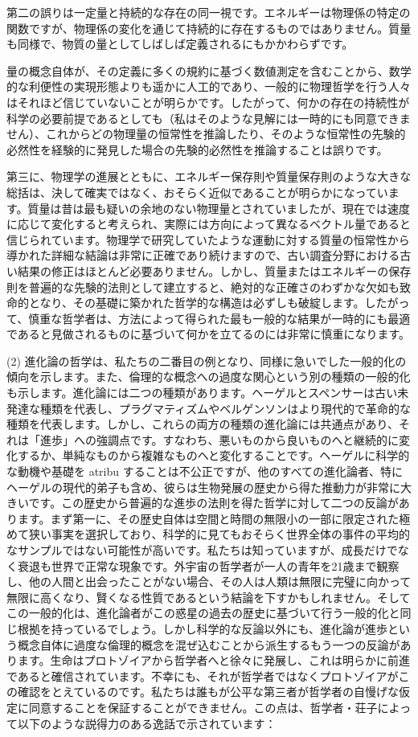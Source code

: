 \documentclass[a4paper,11pt,openany]{ltjsbook}
\begin{document}
第二の誤りは一定量と持続的な存在の同一視です。エネルギーは物理係の特定の関数ですが、物理係の変化を通じて持続的に存在するものではありません。質量も同様で、物質の量としてしばしば定義されるにもかかわらずです。

量の概念自体が、その定義に多くの規約に基づく数値測定を含むことから、数学的な利便性の実現形態よりも遥かに人工的であり、一般的に物理哲学を行う人々はそれほど信じていないことが明らかです。したがって、何かの存在の持続性が科学の必要前提であるとしても（私はそのような見解には一時的にも同意できません）、これからどの物理量の恒常性を推論したり、そのような恒常性の先験的必然性を経験的に発見した場合の先験的必然性を推論することは誤りです。

第三に、物理学の進展とともに、エネルギー保存則や質量保存則のような大きな総括は、決して確実ではなく、おそらく近似であることが明らかになっています。質量は昔は最も疑いの余地のない物理量とされていましたが、現在では速度に応じて変化すると考えられ、実際には方向によって異なるベクトル量であると信じられています。物理学で研究していたような運動に対する質量の恒常性から導かれた詳細な結論は非常に正確であり続けますので、古い調査分野における古い結果の修正はほとんど必要ありません。しかし、質量またはエネルギーの保存則を普遍的な先験的法則として建立すると、絶対的な正確さのわずかな欠如も致命的となり、その基礎に築かれた哲学的な構造は必ずしも破綻します。したがって、慎重な哲学者は、方法によって得られた最も一般的な結果が一時的にも最適であると見做されるものに基づいて何かを立てるのには非常に慎重になります。

(2) 進化論の哲学は、私たちの二番目の例となり、同様に急いでした一般的化の傾向を示します。また、倫理的な概念への過度な関心という別の種類の一般的化も示します。進化論には二つの種類があります。ヘーゲルとスペンサーは古い未発達な種類を代表し、プラグマティズムやベルゲンソンはより現代的で革命的な種類を代表します。しかし、これらの両方の種類の進化論には共通点があり、それは「進歩」への強調点です。すなわち、悪いものから良いものへと継続的に変化するか、単純なものから複雑なものへと変化することです。ヘーゲルに科学的な動機や基礎を atribu することは不公正ですが、他のすべての進化論者、特にヘーゲルの現代的弟子も含め、彼らは生物発展の歴史から得た推動力が非常に大きいです。この歴史から普遍的な進歩の法則を得た哲学に対して二つの反論があります。まず第一に、その歴史自体は空間と時間の無限小の一部に限定された極めて狭い事実を選択しており、科学的に見てもおそらく世界全体の事件の平均的なサンプルではない可能性が高いです。私たちは知っていますが、成長だけでなく衰退も世界で正常な現象です。外宇宙の哲学者が一人の青年を21歳まで観察し、他の人間と出会ったことがない場合、その人は人類は無限に完璧に向かって無限に高くなり、賢くなる性質であるという結論を下すかもしれません。そしてこの一般的化は、進化論者がこの惑星の過去の歴史に基づいて行う一般的化と同じ根拠を持っているでしょう。しかし科学的な反論以外にも、進化論が進歩という概念自体に過度な倫理的概念を混ぜ込むことから派生するもう一つの反論があります。生命はプロトゾイアから哲学者へと徐々に発展し、これは明らかに前進であると確信されています。不幸にも、それが哲学者ではなくプロトゾイアがこの確認をとえているのです。私たちは誰もが公平な第三者が哲学者の自慢げな仮定に同意することを保証することができません。この点は、哲学者・荘子によって以下のような説得力のある逸話で示されています：
\end{document}
